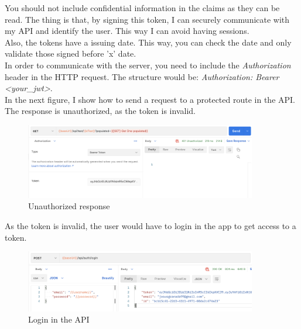         You should not include confidential information in the claims as they can be read. The thing is that, by signing this token, I can securely communicate with my API and identify the user. This way I can avoid having sessions. \\
        Also, the tokens have a issuing date. This way, you can check the date and only validate those signed before 'x' date. \\

        In order to communicate with the server, you need to include the \textit{Authorization} header in the HTTP request. The structure would be: \textit{Authorization: Bearer <your\_jwt>}. \\

        In the next figure, I show how to send a request to a protected route in the API. The response is unauthorized, as the token is invalid. \\
        \begin{figure}[H]
            \centering
                \includegraphics[width=0.9\textwidth]{assets/unauthorized.png}
            \caption{Unauthorized response}
            \label{fig:user_unauthorized}
        \end{figure}

        As the token is invalid, the user would have to login in the app to get access to a token. \\
        \begin{figure}[H]
            \centering
                \includegraphics[width=0.9\textwidth]{assets/login.png}
            \caption{Login in the API}
            \label{fig:user_login_api}
        \end{figure}


